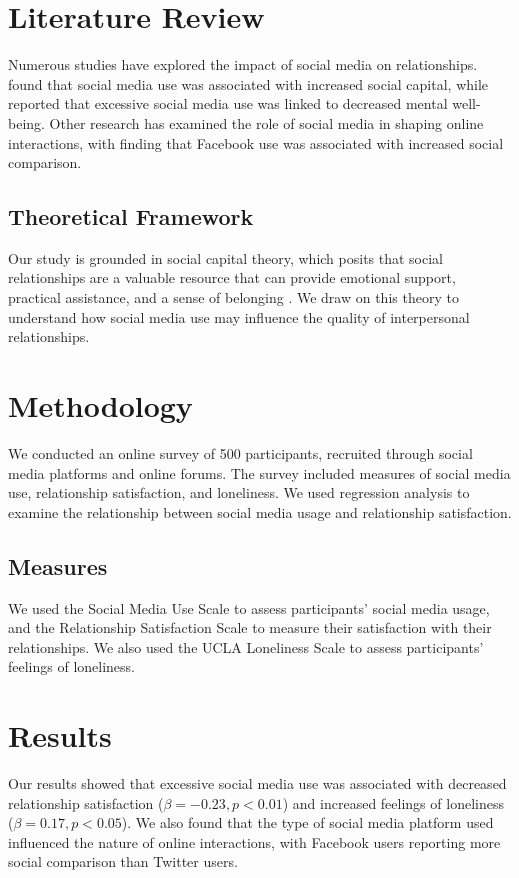 \documentclass[12pt,a4paper]{article}
\begin{document}
\section{Literature Review}
Numerous studies have explored the impact of social media on relationships. \citet{Best2014} found that social media use was associated with increased social capital, while \citet{Kiraly2019} reported that excessive social media use was linked to decreased mental well-being. Other research has examined the role of social media in shaping online interactions, with \citet{Frison2017} finding that Facebook use was associated with increased social comparison.

\subsection{Theoretical Framework}
Our study is grounded in social capital theory, which posits that social relationships are a valuable resource that can provide emotional support, practical assistance, and a sense of belonging \citep{Putnam2000}. We draw on this theory to understand how social media use may influence the quality of interpersonal relationships.

\section{Methodology}
We conducted an online survey of 500 participants, recruited through social media platforms and online forums. The survey included measures of social media use, relationship satisfaction, and loneliness. We used regression analysis to examine the relationship between social media usage and relationship satisfaction.

\subsection{Measures}
We used the Social Media Use Scale to assess participants' social media usage, and the Relationship Satisfaction Scale to measure their satisfaction with their relationships. We also used the UCLA Loneliness Scale to assess participants' feelings of loneliness.

\section{Results}
Our results showed that excessive social media use was associated with decreased relationship satisfaction ($\beta = -0.23, p < 0.01$) and increased feelings of loneliness ($\beta = 0.17, p < 0.05$). We also found that the type of social media platform used influenced the nature of online interactions, with Facebook users reporting more social comparison than Twitter users.
\end{document}
